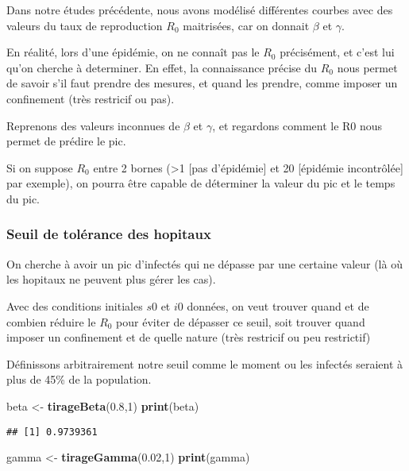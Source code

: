 \documentclass[
]{article}
\newenvironment{Shaded}{\begin{snugshade}}{\end{snugshade}}
\newcommand{\DecValTok}[1]{\textcolor[rgb]{0.00,0.00,0.81}{#1}}
\newcommand{\FloatTok}[1]{\textcolor[rgb]{0.00,0.00,0.81}{#1}}
\newcommand{\KeywordTok}[1]{\textcolor[rgb]{0.13,0.29,0.53}{\textbf{#1}}}
\newcommand{\NormalTok}[1]{#1}
\newcommand{\StringTok}[1]{\textcolor[rgb]{0.31,0.60,0.02}{#1}}
\begin{document}
Dans notre études précédente, nous avons modélisé différentes courbes
avec des valeurs du taux de reproduction \(R_0\) maitrisées, car on
donnait \(\beta\) et \(\gamma\).

En réalité, lors d'une épidémie, on ne connaît pas le \(R_0\)
précisément, et c'est lui qu'on cherche à determiner. En effet, la
connaissance précise du \(R_0\) nous permet de savoir s'il faut prendre
des mesures, et quand les prendre, comme imposer un confinement (très
restricif ou pas).

Reprenons des valeurs inconnues de \(\beta\) et \(\gamma\), et regardons
comment le R0 nous permet de prédire le pic.

Si on suppose \(R_0\) entre 2 bornes (\textgreater1 {[}pas d'épidémie{]}
et 20 {[}épidémie incontrôlée{]} par exemple), on pourra être capable de
déterminer la valeur du pic et le temps du pic.

\hypertarget{seuil-de-toluxe9rance-des-hopitaux}{%
\subsubsection{Seuil de tolérance des
hopitaux}\label{seuil-de-toluxe9rance-des-hopitaux}}

On cherche à avoir un pic d'infectés qui ne dépasse par une certaine
valeur (là où les hopitaux ne peuvent plus gérer les cas).

Avec des conditions initiales \(s0\) et \(i0\) données, on veut trouver
quand et de combien réduire le \(R_0\) pour éviter de dépasser ce seuil,
soit trouver quand imposer un confinement et de quelle nature (très
restricif ou peu restrictif)

Définissons arbitrairement notre seuil comme le moment ou les infectés
seraient à plus de 45\% de la population.

\begin{Shaded}
\begin{Highlighting}[]
\NormalTok{beta <-}\StringTok{ }\KeywordTok{tirageBeta}\NormalTok{(}\FloatTok{0.8}\NormalTok{,}\DecValTok{1}\NormalTok{)}
\KeywordTok{print}\NormalTok{(beta)}
\end{Highlighting}
\end{Shaded}

\begin{verbatim}
## [1] 0.9739361
\end{verbatim}

\begin{Shaded}
\begin{Highlighting}[]
\NormalTok{gamma <-}\StringTok{ }\KeywordTok{tirageGamma}\NormalTok{(}\FloatTok{0.02}\NormalTok{,}\DecValTok{1}\NormalTok{)}
\KeywordTok{print}\NormalTok{(gamma)}
\end{Highlighting}
\end{Shaded}
\end{document}
